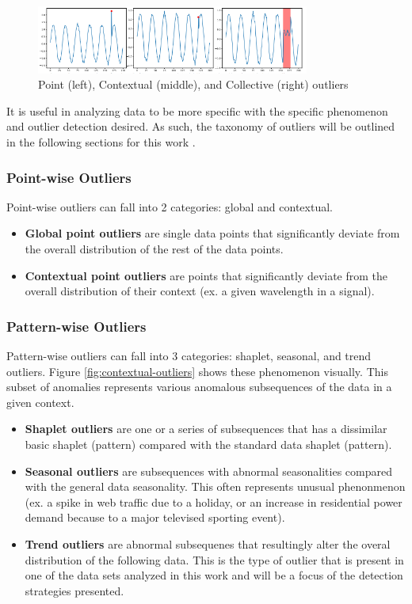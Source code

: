 \begin{figure}[H]
    \centering
    \includegraphics[width=0.8\textwidth]{Images/outliers_graphic.PNG}
    \caption{Point (left), Contextual (middle), and Collective (right) outliers \cite{lai2021revisiting}}
    \label{fig:outliers-graphic}
\end{figure}

It is useful in analyzing data to be more specific with the specific phenomenon and outlier detection desired. As such, the taxonomy of outliers will be outlined in the following sections for this work \cite{lai2021revisiting}.

\subsubsection{Point-wise Outliers}
Point-wise outliers can fall into 2 categories: global and contextual.
\begin{itemize}[leftmargin=1cm]
    \item \textbf{Global point outliers} are single data points that significantly deviate from the overall distribution of the rest of the data points.
    \item \textbf{Contextual point outliers} are points that significantly deviate from the overall distribution of their context (ex. a  given wavelength in a signal).
\end{itemize} 
\subsubsection{Pattern-wise Outliers}
Pattern-wise outliers can fall into 3 categories: shaplet, seasonal, and trend outliers. Figure \ref{fig:contextual-outliers} shows these phenomenon visually. This subset of anomalies represents various anomalous subsequences of the data in a given context. 
\begin{itemize}[leftmargin=1cm]
    \item \textbf{Shaplet outliers} are one or a series of subsequences that has a dissimilar basic shaplet (pattern) compared with the standard data shaplet (pattern).
    \item \textbf{Seasonal outliers} are subsequences with abnormal seasonalities compared with the general data seasonality. This often represents unusual phenonmenon (ex. a spike in web traffic due to a holiday, or an increase in residential power demand because to a major televised sporting event). 
    \item \textbf{Trend outliers} are abnormal subsequenes that resultingly alter the overal distribution of the following data. This is the type of outlier that is present in one of the data sets analyzed in this work and will be a focus of the detection strategies presented. 
\end{itemize} 

